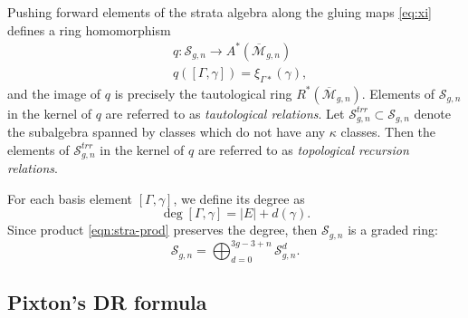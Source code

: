 \documentclass[12pt,reqno]{amsart}
\theoremstyle{plain}
\theoremstyle{definition}
\newtheorem{definition}[theorem]{Definition}
\theoremstyle{remark}
\begin{document}
Pushing forward elements of the strata algebra along the gluing maps \eqref{eq:xi} defines a ring homomorphism
\begin{align*}
&q\colon\mathcal{S}_{g,n}\to A^*(\overline{\mathcal{M}}_{g,n})\\
&q([\Gamma,\gamma])=\xi_{\Gamma*}(\gamma),
\end{align*}
and the image of $q$ is precisely the tautological ring $R^*(\overline{\mathcal{M}}_{g,n})$.  Elements of $\mathcal{S}_{g,n}$ in the kernel of $q$ are referred to as {\it tautological relations}. Let $\mathcal{S}^{trr}_{g,n}\subset \mathcal{S}_{g,n}$ denote the subalgebra spanned by classes which do not have any $\kappa$ classes. Then the elements of $\mathcal{S}^{trr}_{g,n}$ in the kernel of $q$ are referred to as {\it topological recursion relations}. 

For each basis element $[\Gamma,\gamma]$, we define its degree as
\begin{equation*}
\deg[\Gamma,\gamma]=|E|+d(\gamma).
\end{equation*}
Since product \eqref{eqn:stra-prod} preserves the degree, then  $\mathcal{S}_{g,n}$ is a graded ring:
\begin{equation*}
\mathcal{S}_{g,n}=\bigoplus_{d=0}^{3g-3+n}\mathcal{S}_{g,n}^d.
\end{equation*}




\subsection{Pixton's DR formula}\label{subsec: pixton-formula}
\end{document}
